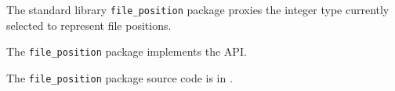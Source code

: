 
The standard library {\tt file\_position} package proxies the integer type currently 
selected to represent file positions.

The {\tt file\_position} package implements the  API.

The {\tt file\_position} package source code is in .

